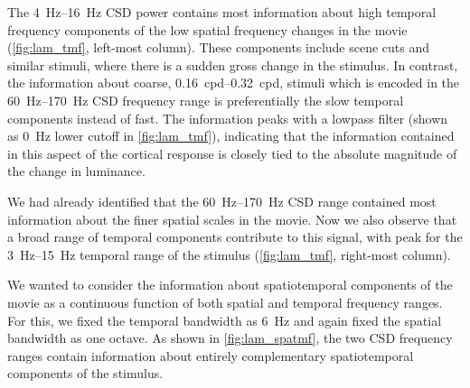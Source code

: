The \SIrange{4}{16}{Hz} \ac{CSD} power contains most information about high temporal frequency components of the low spatial frequency changes in the movie (\autoref{fig:lam_tmf}, left-most column).
These components include scene cuts and similar stimuli, where there is a sudden gross change in the stimulus.
In contrast, the information about coarse, \SIrange{0.16}{0.32}{cpd}, stimuli which is encoded in the \SIrange{60}{170}{Hz} \ac{CSD} frequency range is preferentially the slow temporal components instead of fast.
The information peaks with a lowpass filter (shown as \SI{0}{Hz} lower cutoff in \autoref{fig:lam_tmf}), indicating that the information contained in this aspect of the cortical response is closely tied to the absolute magnitude of the change in luminance.

We had already identified that the \SIrange{60}{170}{Hz} \ac{CSD} range contained most information about the finer spatial scales in the movie.
Now we also observe that a broad range of temporal components contribute to this signal, with peak for the \SIrange{3}{15}{Hz} temporal range of the stimulus (\autoref{fig:lam_tmf}, right-most column).


We wanted to consider the information about spatiotemporal components of the movie as a continuous function of both spatial and temporal frequency ranges.
For this, we fixed the temporal bandwidth as \SI{6}{Hz} and again fixed the spatial bandwidth as one octave.
As shown in \autoref{fig:lam_spatmf}, the two \ac{CSD} frequency ranges contain information about entirely complementary spatiotemporal components of the stimulus.

